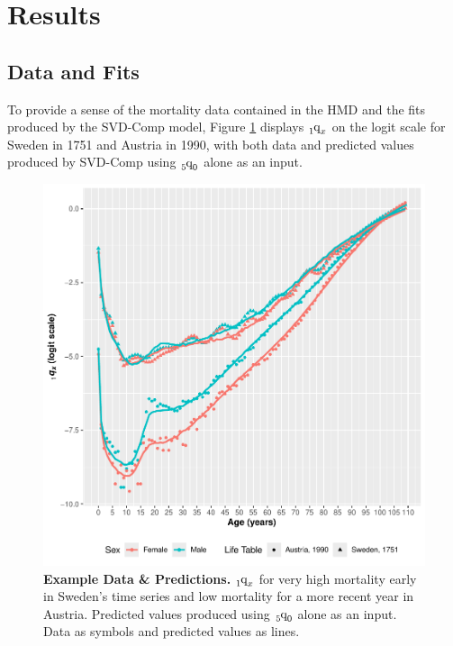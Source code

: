 \documentclass[11pt]{article}
\newcommand{\qf}{\tensor*[_5]{\mbox{q}}{_0}}
\newcommand{\qox}{\tensor*[_{1}]{\mbox{q}}{_{x}}}
\begin{document}
\section{Results \label{sec:results}}

\subsection{Data and Fits}

To provide a sense of the mortality data contained in the HMD and the fits produced by the SVD-Comp model, Figure \ref{fig:data} displays $\qox$ on the logit scale for Sweden in 1751 and Austria in 1990, with both data and predicted values produced by SVD-Comp using $\qf$ alone as an input.

\begin{figure}[htbp]
   \centering
   \includegraphics[width=\linewidth]{../figures/fig1.pdf} 
   \captionsetup{format=plain,font=normalsize,margin=0cm,justification=justified}
   \caption{\textbf{Example Data \& Predictions.}  $\qox$ for very high mortality early in Sweden's time series and low mortality for a more recent year in Austria.  Predicted values produced using $\qf$ alone as an input.  Data as symbols and predicted values as lines.}
   \label{fig:data}
\end{figure}
\end{document}

